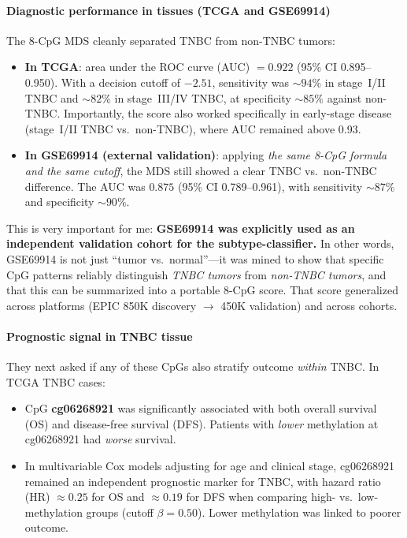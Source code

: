 \documentclass[10pt]{extarticle}
\begin{document}
\paragraph{Diagnostic performance in tissues (TCGA and GSE69914)}
The 8-CpG MDS cleanly separated TNBC from non-TNBC tumors:
\begin{itemize}[label=-]
    \item \textbf{In TCGA}: area under the ROC curve (AUC) \(= 0.922\) (95\% CI 0.895--0.950). With a decision cutoff of \(-2.51\), sensitivity was \(\sim 94\%\) in stage~I/II TNBC and \(\sim 82\%\) in stage~III/IV TNBC, at specificity \(\sim 85\%\) against non-TNBC. Importantly, the score also worked specifically in early-stage disease (stage~I/II TNBC vs.\ non-TNBC), where AUC remained above 0.93. 
    \item \textbf{In GSE69914 (external validation)}: applying \emph{the same 8-CpG formula and the same cutoff}, the MDS still showed a clear TNBC vs.\ non-TNBC difference. The AUC was \(0.875\) (95\% CI 0.789--0.961), with sensitivity \(\sim 87\%\) and specificity \(\sim 90\%\). 
\end{itemize}

This is very important for me: \textbf{GSE69914 was explicitly used as an independent validation cohort for the subtype-classifier.}  
In other words, GSE69914 is not just ``tumor vs.\ normal''---it was mined to show that specific CpG patterns reliably distinguish \emph{TNBC tumors} from \emph{non-TNBC tumors}, and that this can be summarized into a portable 8-CpG score. That score generalized across platforms (EPIC 850K discovery \(\rightarrow\) 450K validation) and across cohorts. 

\paragraph{Prognostic signal in TNBC tissue}
They next asked if any of these CpGs also stratify outcome \textit{within} TNBC. In TCGA TNBC cases:
\begin{itemize}[label=-]
    \item CpG \textbf{cg06268921} was significantly associated with both overall survival (OS) and disease-free survival (DFS). Patients with \emph{lower} methylation at cg06268921 had \emph{worse} survival.
    \item In multivariable Cox models adjusting for age and clinical stage, cg06268921 remained an independent prognostic marker for TNBC, with hazard ratio (HR) \(\approx 0.25\) for OS and \(\approx 0.19\) for DFS when comparing high- vs.\ low-methylation groups (cutoff \(\beta = 0.50\)). Lower methylation was linked to poorer outcome. 
\end{itemize}
\end{document}
